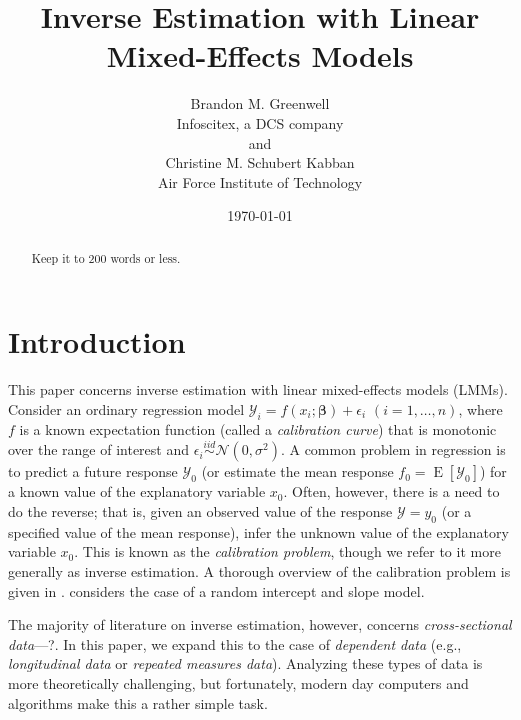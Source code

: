 \documentclass{article}\usepackage[]{graphicx}\usepackage[]{color}
\title{Inverse Estimation with Linear Mixed-Effects Models}
\author{Brandon M. Greenwell\\Infoscitex, a DCS company \\ and \\
        Christine M. Schubert Kabban\\Air Force Institute of Technology}
\date{\today}
\newcommand{\E}{\operatorname{E}}
\begin{document}
\maketitle





\begin{abstract}
Keep it to 200 words or less.
\end{abstract}


\section{Introduction}

This paper concerns inverse estimation with linear mixed-effects models (LMMs). Consider an ordinary regression model $\mathcal{Y}_i = f\left(x_i; \bm{\beta} \right) + \epsilon_i$ $(i = 1, \dotsc, n)$, where $f$ is a known expectation function (called a \emph{calibration curve}) that is monotonic over the range of interest and $\epsilon_i \stackrel{iid}{\sim} \mathcal{N}\left( 0, \sigma^2 \right)$.  A common problem in regression is to predict a future response $\mathcal{Y}_0$ (or estimate the mean response $f_0 = \E\left[\mathcal{Y}_0\right]$) for a known value of the explanatory variable $x_0$.  Often, however, there is a need to do the reverse; that is, given an observed value of the response $\mathcal{Y} = y_0$ (or a specified value of the mean response), infer the unknown value of the explanatory variable $x_0$.  This is known as the \emph{calibration problem}, though we refer to it more generally as inverse estimation.  A thorough overview of the calibration problem is given in \citet{osborne-statistical-1991}.  \citet{oman-calibration-1998} considers the case of a random intercept and slope model. 

The majority of literature on inverse estimation, however, concerns \textit{cross-sectional data}---?. In this paper, we expand this to the case of \textit{dependent data} (e.g., \textit{longitudinal data} or \textit{repeated measures data}). Analyzing these types of data is more theoretically challenging, but fortunately, modern day computers and algorithms make this a rather simple task.
\end{document}
